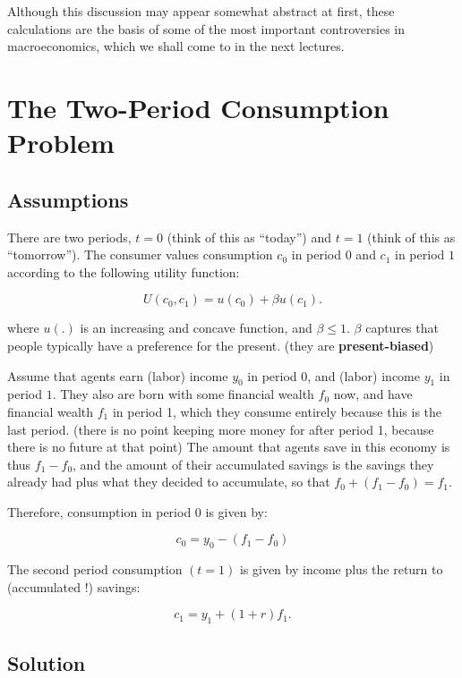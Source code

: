 \documentclass[]{book}
\theoremstyle{definition}
\theoremstyle{definition}
\theoremstyle{definition}
\theoremstyle{remark}
\begin{document}
Although this discussion may appear somewhat abstract at first, these
calculations are the basis of some of the most important controversies
in macroeconomics, which we shall come to in the next lectures.

\section{The Two-Period Consumption
Problem}\label{the-two-period-consumption-problem}

\subsection{Assumptions}\label{assumptions}

There are two periods, \(t=0\) (think of this as ``today'') and \(t=1\)
(think of this as ``tomorrow''). The consumer values consumption \(c_0\)
in period \(0\) and \(c_1\) in period \(1\) according to the following
utility function:

\[U(c_{0},c_{1})=u(c_{0})+\beta u(c_{1}).\]

where \(u(.)\) is an increasing and concave function, and
\(\beta \leq 1\). \(\beta\) captures that people typically have a
preference for the present. (they are \textbf{present-biased})

Assume that agents earn (labor) income \(y_{0}\) in period \(0\), and
(labor) income \(y_{1}\) in period \(1\). They also are born with some
financial wealth \(f_{0}\) now, and have financial wealth \(f_{1}\) in
period 1, which they consume entirely because this is the last period.
(there is no point keeping more money for after period 1, because there
is no future at that point) The amount that agents save in this economy
is thus \(f_{1}-f_{0}\), and the amount of their accumulated savings is
the savings they already had plus what they decided to accumulate, so
that \(f_{0}+(f_{1}-f_{0})=f_{1}.\)

Therefore, consumption in period \(0\) is given by:

\[c_{0} =y_{0}-(f_{1}-f_{0})\]

The second period consumption \((t=1)\) is given by income plus the
return to (accumulated !) savings:

\[c_{1} =y_{1}+(1+r)f_{1}.\]

\subsection{Solution}\label{solution}
\end{document}
